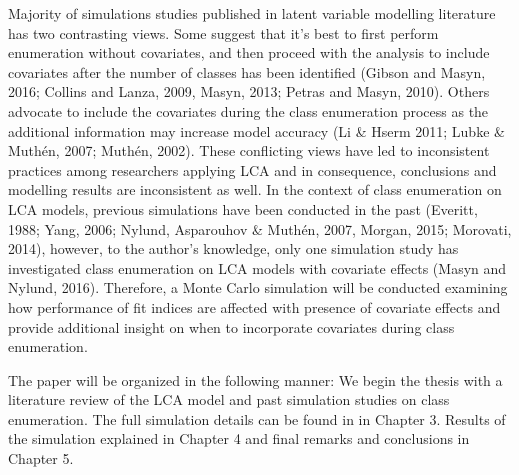 Majority of simulations studies published in latent variable modelling literature has two contrasting views. Some suggest that it's best to first perform enumeration without covariates, and then proceed with the analysis to include covariates after the number of classes has been identified (Gibson and Masyn, 2016; Collins and Lanza, 2009, Masyn, 2013; Petras and Masyn, 2010). Others advocate to include the covariates during the class enumeration process as the additional information may increase model accuracy (Li \& Hserm 2011; Lubke \& Muth\'en, 2007; Muth\'en, 2002). These conflicting views have led to inconsistent practices among researchers applying LCA and in consequence, conclusions and modelling results are inconsistent as well. In the context of class enumeration on LCA models, previous simulations have been conducted in the past (Everitt, 1988; Yang, 2006; Nylund, Asparouhov \& Muth\'en, 2007, Morgan, 2015; Morovati, 2014), however, to the author's knowledge, only one simulation study has investigated class enumeration on LCA models with covariate effects (Masyn and Nylund, 2016). Therefore, a Monte Carlo simulation will be conducted examining how performance of fit indices are affected with presence of covariate effects and provide additional insight on when to incorporate covariates during class enumeration. 

The paper will be organized in the following manner: We begin the thesis with a literature review of the LCA model and past simulation studies on class enumeration. The full simulation details can be found in in Chapter 3. Results of the simulation explained in Chapter 4 and final remarks and conclusions in Chapter 5. 





